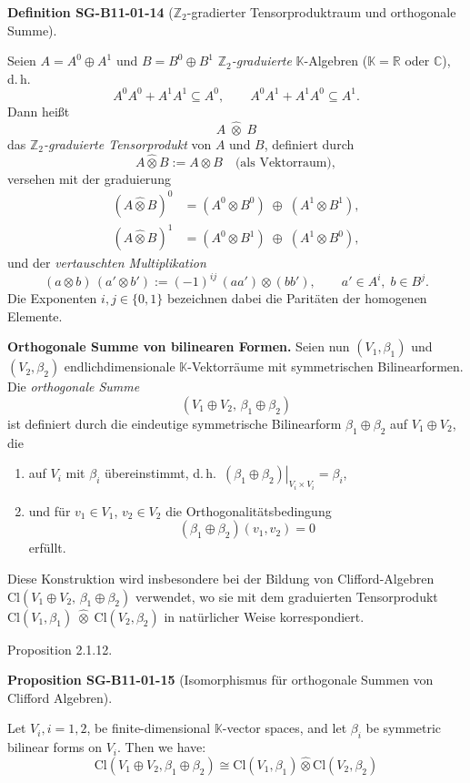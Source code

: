 \documentclass[10pt, letterpaper]{article}
\newcommand{\Cl}{\mathrm{Cl}}
\newcommand{\CustomHeading}[3]{%
  \par\medskip\noindent%
  \textbf{#1 #2} \textnormal{(#3)}.\enskip%
}
\newenvironment{DEF}[2]{\begin{unitbox}\CustomHeading{Definition}{#1}{#2}}{\end{unitbox}}
\newenvironment{PROP}[2]{\begin{unitbox}\CustomHeading{Proposition}{#1}{#2}}{\end{unitbox}}
\begin{document}
\begin{DEF}{SG-B11-01-14}{\(\mathbb{Z}_2\)-gradierter Tensorproduktraum und orthogonale Summe}
Seien $A=A^{0}\oplus A^{1}$ und $B=B^{0}\oplus B^{1}$ $\mathbb{Z}_{2}$\textit{-graduierte} $\mathbb{K}$-Algebren ($\mathbb{K}=\mathbb{R}$ oder $\mathbb{C}$), d.\,h.
\[
A^{0}A^{0}+A^{1}A^{1}\subseteq A^{0}, \qquad
A^{0}A^{1}+A^{1}A^{0}\subseteq A^{1}.
\]
Dann heißt
\[
A\;\hat{\otimes}\; B
\]
das \emph{$\mathbb{Z}_{2}$-graduierte Tensorprodukt} von $A$ und $B$, definiert durch
\[
A\hat{\otimes}B := A\otimes B \quad \text{(als Vektorraum)},
\]
versehen mit der graduierung
\[
\begin{aligned}
(A\hat{\otimes}B)^{0} &= (A^{0}\otimes B^{0})\;\oplus\;(A^{1}\otimes B^{1}),\\
(A\hat{\otimes}B)^{1} &= (A^{0}\otimes B^{1})\;\oplus\;(A^{1}\otimes B^{0}),
\end{aligned}
\]
und der \emph{vertauschten Multiplikation}
\[
(a\otimes b)\,(a'\otimes b')
:= (-1)^{ij}\, (a a')\otimes (b b'),
\qquad a'\in A^{i},\; b\in B^{j}.
\]
Die Exponenten $i,j\in\{0,1\}$ bezeichnen dabei die Paritäten der homogenen Elemente.

\medskip
\textbf{Orthogonale Summe von bilinearen Formen.}
Seien nun $(V_{1},\beta_{1})$ und $(V_{2},\beta_{2})$ endlichdimensionale $\mathbb{K}$-Vektorräume mit symmetrischen Bilinearformen.
Die \emph{orthogonale Summe}
\[
(V_{1}\oplus V_{2},\,\beta_{1}\oplus \beta_{2})
\]
ist definiert durch die eindeutige symmetrische Bilinearform $\beta_{1}\oplus \beta_{2}$ auf $V_{1}\oplus V_{2}$, die
\begin{enumerate}
\item auf $V_{i}$ mit $\beta_{i}$ übereinstimmt, d.\,h.\ $\left.(\beta_{1}\oplus \beta_{2})\right|_{V_{i}\times V_{i}}=\beta_{i}$,
\item und für $v_{1}\in V_{1}$, $v_{2}\in V_{2}$ die Orthogonalitätsbedingung
\[
(\beta_{1}\oplus \beta_{2})(v_{1},v_{2})=0
\]
erfüllt.
\end{enumerate}
Diese Konstruktion wird insbesondere bei der Bildung von Clifford-Algebren
\(\Cl(V_{1}\oplus V_{2},\,\beta_{1}\oplus \beta_{2})\)
verwendet, wo sie mit dem graduierten Tensorprodukt
\(\Cl(V_{1},\beta_{1})\;\hat{\otimes}\;\Cl(V_{2},\beta_{2})\)
in natürlicher Weise korrespondiert.
\end{DEF}




Proposition 2.1.12. 


\begin{PROP}{SG-B11-01-15}{Isomorphismus für orthogonale Summen von Clifford Algebren}
Let $V_{i}, i=1,2$, be finite-dimensional $\mathbb{K}$-vector spaces, and let $\beta_{i}$ be symmetric bilinear forms on $V_{i}$. Then we have:
$$
\mathrm{Cl}\left(V_{1} \oplus V_{2}, \beta_{1} \oplus \beta_{2}\right) \cong \mathrm{Cl}\left(V_{1}, \beta_{1}\right) \hat{\otimes} \mathrm{Cl}\left(V_{2}, \beta_{2}\right)
$$
\end{PROP}
\end{document}
